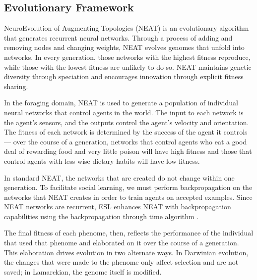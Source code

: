 \documentclass{sig-alternate}
\begin{document}
\subsection*{Evolutionary Framework}
NeuroEvolution of Augmenting Topologies (NEAT)\cite{stanley2002evolving} is an evolutionary algorithm that generates recurrent neural networks. Through a process of adding and removing nodes and changing weights, NEAT evolves genomes that unfold into networks. In every generation, those networks with the highest fitness reproduce, while those with the lowest fitness are unlikely to do so. NEAT maintains genetic diversity through speciation and encourages innovation through explicit fitness sharing.

In the foraging domain, NEAT is used to generate a population of individual neural networks that control agents in the world. The input to each network is the agent's sensors, and the outputs control the agent's velocity and orientation. The fitness of each network is determined by the success of the agent it controls--- over the course of a generation, networks that control agents who eat a good deal of rewarding food and very little poison will have high fitness and those that control agents with less wise dietary habits will have low fitness.

In standard NEAT, the networks that are created do not change within one generation. To facilitate social learning, we must perform backpropagation \cite{rumelhart1986learning} on the networks that NEAT creates in order to train agents on accepted examples. Since NEAT networks are recurrent, ESL enhances NEAT with backpropagation capabilities using the backpropagation through time algorithm \cite{werbos1990backpropagation} .

The final fitness of each phenome, then, reflects the performance of the individual that used that phenome and elaborated on it over the course of a generation. This elaboration drives evolution in two alternate ways.  In Darwinian evolution, the changes that were made to the phenome only affect selection and are not saved; in Lamarckian, the genome itself is modified.
\end{document}
